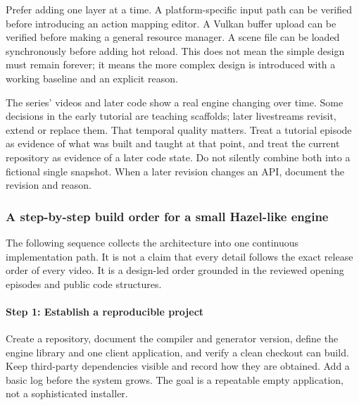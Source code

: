 Prefer adding one layer at a time. A platform-specific input path can be verified before introducing an action mapping editor. A Vulkan buffer upload can be verified before making a general resource manager. A scene file can be loaded synchronously before adding hot reload. This does not mean the simple design must remain forever; it means the more complex design is introduced with a working baseline and an explicit reason.

The series' videos and later code show a real engine changing over time. Some decisions in the early tutorial are teaching scaffolds; later livestreams revisit, extend or replace them. That temporal quality matters. Treat a tutorial episode as evidence of what was built and taught at that point, and treat the current repository as evidence of a later code state. Do not silently combine both into a fictional single snapshot. When a later revision changes an API, document the revision and reason.

\subsubsection{A step-by-step build order for a small Hazel-like engine}\label{06-engine-ii-ch042-a-step-by-step-build-order-for-a-small-hazel-like-engine}

\hypertarget{06-engine-ii-ch042-a-step-by-step-build-order-for-a-small-hazel-like-engine}{}

The following sequence collects the architecture into one continuous implementation path. It is not a claim that every detail follows the exact release order of every video. It is a design-led order grounded in the reviewed opening episodes and public code structures.

\paragraph{Step 1: Establish a reproducible project}\label{06-engine-ii-ch042-step-1-establish-a-reproducible-project}

\hypertarget{06-engine-ii-ch042-step-1-establish-a-reproducible-project}{}

Create a repository, document the compiler and generator version, define the engine library and one client application, and verify a clean checkout can build. Keep third-party dependencies visible and record how they are obtained. Add a basic log before the system grows. The goal is a repeatable empty application, not a sophisticated installer.

